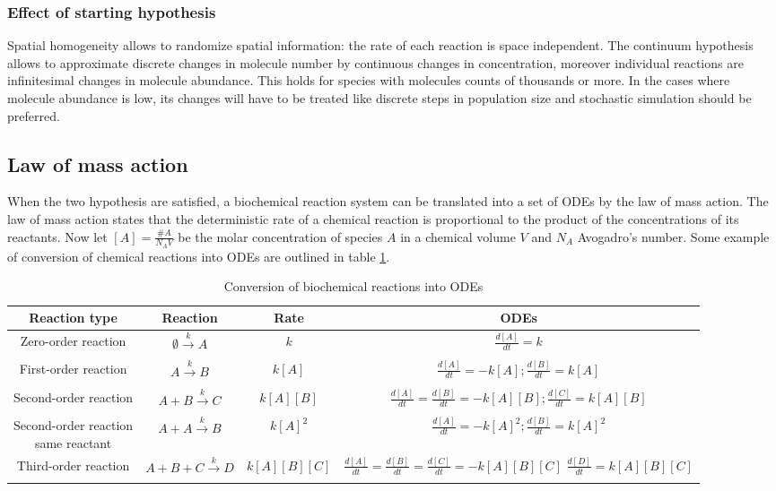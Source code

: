     \subsubsection{Effect of starting hypothesis}
    Spatial homogeneity allows to randomize spatial information: the rate of each reaction is space independent.
    The continuum hypothesis allows to approximate discrete changes in molecule number by continuous changes in concentration, moreover individual reactions are infinitesimal changes in molecule abundance.
    This holds for species with molecules counts of thousands or more.
    In the cases where molecule abundance is low, its changes will have to be treated like discrete steps in population size and stochastic simulation should be preferred.

  \subsection{Law of mass action}
  When the two hypothesis are satisfied, a biochemical reaction system can be translated into a set of ODEs by the law of mass action.
  The law of mass action states that the deterministic rate of a chemical reaction is proportional to the product of the concentrations of its reactants.
  Now let $[A] = \frac{\# A}{N_AV}$ be the molar concentration of species $A$ in a chemical volume $V$ and $N_A$ Avogadro's number.
  Some example of conversion of chemical reactions into ODEs are outlined in table \ref{tab:chem-odes}.

  \begin{table}[H]
    \centering
    \begin{tabular}{c c c c}
      \hline
      Reaction type & Reaction & Rate & ODEs\\
      \hline
      Zero-order reaction & $\emptyset\xrightarrow[]{k} A$ & $k$ & $\frac{d[A]}{dt} = k$\\
      First-order reaction & $A\xrightarrow[]{k} B$ & $k[A]$ & $\frac{d[A]}{dt} = -k[A];\frac{d[B]}{dt} = k[A]$\\
      Second-order reaction & $A+B\xrightarrow[]{k} C$ & $k[A][B]$ & $\frac{d[A]}{dt} = \frac{d[B]}{dt} = -k[A][B];\frac{d[C]}{dt} = k[A][B]$\\
      \makecell{Second-order reaction\\ same reactant} & $A+A\xrightarrow[]{k} B$ & $k[A]^2$ & $\frac{d[A]}{dt} = -k[A]^2;\frac{d[B]}{dt} = k[A]^2$\\
      Third-order reaction & $A+B+C\xrightarrow[]{k} D$ & $k[A][B][C]$ & \makecell{$\frac{d[A]}{dt} = \frac{d[B]}{dt} = \frac{d[C]}{dt} =  -k[A][B][C]$\\$\frac{d[D]}{dt} = k[A][B][C]$}\\
      \hline
    \end{tabular}
    \caption{Conversion of biochemical reactions into ODEs}
    \label{tab:chem-odes}
  \end{table}

